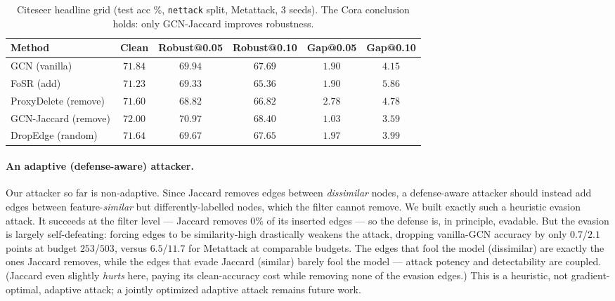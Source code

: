 \documentclass[10pt]{article}
\begin{document}
\begin{table}[h]
\centering\small
\begin{tabular}{@{}lccccc@{}}
\toprule
\textbf{Method} & \textbf{Clean} & \textbf{Robust@0.05} & \textbf{Robust@0.10} & \textbf{Gap@0.05} & \textbf{Gap@0.10} \\
\midrule
GCN (vanilla)        & $71.84$ & $69.94$ & $67.69$ & $1.90$ & $4.15$ \\
FoSR (add)           & $71.23$ & $69.33$ & $65.36$ & $1.90$ & $5.86$ \\
ProxyDelete (remove) & $71.60$ & $68.82$ & $66.82$ & $2.78$ & $4.78$ \\
GCN-Jaccard (remove) & $72.00$ & $\mathbf{70.97}$ & $\mathbf{68.40}$ & $\mathbf{1.03}$ & $\mathbf{3.59}$ \\
DropEdge (random)    & $71.64$ & $69.67$ & $67.65$ & $1.97$ & $3.99$ \\
\bottomrule
\end{tabular}
\caption{Citeseer headline grid (test acc \%, \texttt{nettack} split, Metattack, 3 seeds). The Cora
conclusion holds: only GCN-Jaccard improves robustness.}
\label{tab:citeseer}
\end{table}

\paragraph{An adaptive (defense-aware) attacker.} Our attacker so far is non-adaptive. Since Jaccard
removes edges between \emph{dissimilar} nodes, a defense-aware attacker should instead add edges between
feature-\emph{similar} but differently-labelled nodes, which the filter cannot remove. We built exactly
such a heuristic evasion attack. It succeeds at the filter level --- Jaccard removes $0\%$ of its inserted
edges --- so the defense is, in principle, evadable. But the evasion is largely self-defeating: forcing
edges to be similarity-high drastically weakens the attack, dropping vanilla-GCN accuracy by only
$0.7$/$2.1$ points at budget $253$/$503$, versus $6.5$/$11.7$ for Metattack at comparable budgets. The
edges that fool the model (dissimilar) are exactly the ones Jaccard removes, while the edges that evade
Jaccard (similar) barely fool the model --- attack potency and detectability are coupled. (Jaccard even
slightly \emph{hurts} here, paying its clean-accuracy cost while removing none of the evasion edges.) This
is a heuristic, not gradient-optimal, adaptive attack; a jointly optimized adaptive attack remains future
work.
\end{document}
